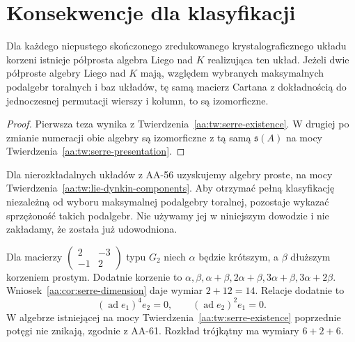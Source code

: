 \section{Konsekwencje dla klasyfikacji}

\begin{wniosek}
\label{aa:cor:serre-classification-step}
Dla każdego niepustego skończonego zredukowanego krystalograficznego układu korzeni istnieje półprosta algebra Liego nad $K$ realizująca ten układ. Jeżeli dwie półproste algebry Liego nad $K$ mają, względem wybranych maksymalnych podalgebr toralnych i baz układów, tę samą macierz Cartana z dokładnością do jednoczesnej permutacji wierszy i kolumn, to są izomorficzne.
\end{wniosek}
\begin{proof}
Pierwsza teza wynika z Twierdzenia~\ref{aa:tw:serre-existence}. W drugiej po zmianie numeracji obie algebry są izomorficzne z tą samą $\mathfrak s(A)$ na mocy Twierdzenia~\ref{aa:tw:serre-presentation}.
\end{proof}

Dla nierozkładalnych układów z AA-56 uzyskujemy algebry proste, na mocy Twierdzenia~\ref{aa:tw:lie-dynkin-components}. Aby otrzymać pełną klasyfikację niezależną od wyboru maksymalnej podalgebry toralnej, pozostaje wykazać sprzężoność takich podalgebr. Nie używamy jej w niniejszym dowodzie i nie zakładamy, że została już udowodniona.

\begin{przyklad}
\label{aa:prz:serre-rank-two}
Dla macierzy $\left(\begin{smallmatrix}2&-3\\-1&2\end{smallmatrix}\right)$ typu $G_2$ niech $\alpha$ będzie krótszym, a $\beta$ dłuższym korzeniem prostym. Dodatnie korzenie to $\alpha,\beta,\alpha+\beta,2\alpha+\beta,3\alpha+\beta,3\alpha+2\beta$. Wniosek~\ref{aa:cor:serre-dimension} daje wymiar $2+12=14$. Relacje dodatnie to
\[
 (\operatorname{ad}e_1)^4e_2=0,\qquad
 (\operatorname{ad}e_2)^2e_1=0.
\]
W algebrze istniejącej na mocy Twierdzenia~\ref{aa:tw:serre-existence} poprzednie potęgi nie znikają, zgodnie z AA-61. Rozkład trójkątny ma wymiary $6+2+6$.
\end{przyklad}

